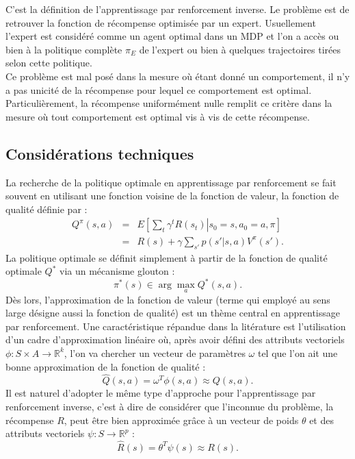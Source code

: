 \documentclass[publibook-draft]{CAp2012}
\begin{document}
C'est la définition de l'apprentissage par renforcement inverse. Le problème est de retrouver la fonction de récompense optimisée par un expert. Usuellement l'expert est considéré comme un agent optimal dans un MDP et l'on a accès ou bien à la politique complète $\pi_E$ de l'expert ou bien à quelques trajectoires tirées selon cette politique.\\

Ce problème est mal posé dans la mesure où étant donné un comportement, il n'y a pas unicité de la récompense pour lequel ce comportement est optimal. Particulièrement, la récompense uniformément nulle remplit ce critère dans la mesure où tout comportement est optimal vis à vis de cette récompense.
\subsection{Considérations techniques}
La recherche de la politique optimale en apprentissage par renforcement se fait souvent en utilisant une fonction voisine de la fonction de valeur, la fonction de qualité définie par :
\begin{eqnarray}
Q^\pi(s,a) &=& E\left[\left.\sum_t\gamma^tR(s_t)\right|s_0=s,a_0=a,\pi\right]\\
&=& R(s) + \gamma\sum_{s'}p(s'|s,a)V^\pi(s').
\end{eqnarray}
La politique optimale se définit simplement à partir de la fonction de qualité optimale $Q^*$ via un mécanisme glouton :
\begin{equation}
\pi^*(s) \in \arg\max_a Q^*(s,a).
\end{equation}
Dès lors, l'approximation de la fonction de valeur (terme qui employé au sens large désigne aussi la fonction de qualité) est un thème central en apprentissage par renforcement. Une caractéristique répandue dans la litérature est l'utilisation d'un cadre d'approximation linéaire où, après avoir défini des attributs vectoriels $\phi: S\times A \rightarrow \mathbb{R}^k$, l'on va chercher un vecteur de paramètres $\omega$ tel que l'on ait une bonne approximation de la fonction de qualité :
\begin{equation}
\hat Q (s,a) = \omega^T\phi(s,a)\approx Q(s,a).
\end{equation}
Il est naturel d'adopter le même type d'approche pour l'apprentissage par renforcement inverse, c'est à dire de considérer que l'inconnue du problème, la récompense $R$, peut être bien approximée grâce à un vecteur de poids $\theta$ et des attributs vectoriels $\psi : S\rightarrow \mathbb{R}^p$ :
\begin{equation}
\hat R(s) = \theta^T\psi(s)\approx R(s).
\end{equation}
\end{document}
